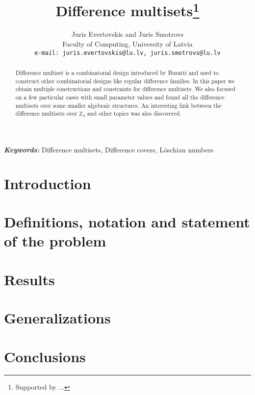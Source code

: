\documentclass{article}
\theoremstyle{plain}
\theoremstyle{definition}
\theoremstyle{remark}
\providecommand{\keywords}[1]{\textbf{\textit{Keywords: }} #1}
\begin{document}
\title{Difference multisets\thanks{Supported by ...}}
\date{}
\author{Juris Evertovskis and Juris Smotrovs\\
\small Faculty of Computing, University of Latvia\\
{\small \tt e-mail: juris.evertovskis@lu.lv, juris.smotrovs@lu.lv}}

\maketitle
	
	\begin{abstract}
		Difference multiset is a combinatorial design introduced by Buratti \cite{buratti1999old} and used to construct other combinatorial designs like regular difference families. In this paper we obtain multiple constructions and constraints for difference multisets. We also focused on a few particular cases with small parameter values and found all the difference multisets over some smaller algebraic structures. An interesting link between the difference multisets over $\mathbb Z_3$ and other topics was also discovered.
	\end{abstract}
	
	\keywords{Difference multisets, Difference covers, Löschian numbers}
    
    \section{Introduction}
    
     
	\section{Definitions, notation and statement of the problem}
    
	
    \section{Results}
    
	
    \section{Generalizations}
    

    \section{Conclusions}
    
    
	
	
\end{document}
